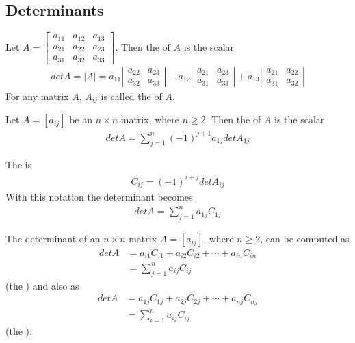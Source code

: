 \documentclass{article}
\begin{document}
\subsection{Determinants}
\begin{definition}
    Let $A=\begin{bmatrix}
        a_{11} &a_{12} &a_{13}\\ 
        a_{21} &a_{22} &a_{23}\\ 
        a_{31} &a_{32} &a_{33}
    \end{bmatrix}$.
    Then the  of $A$ is the scalar
    \begin{align*}
        det A = |A| = a_{11}\left|\begin{array}{ccc}
            a_{22} &a_{23}\\ 
            a_{32} &a_{33}
        \end{array}\right| -
        a_{12}\left|\begin{array}{ccc}
            a_{21} &a_{23}\\ 
            a_{31} &a_{33}
        \end{array}\right| +
        a_{13}\left|\begin{array}{ccc}
            a_{21} &a_{22}\\ 
            a_{31} &a_{32}
        \end{array}\right|
    \end{align*}
    For any matrix $A$, $A_{ij}$ is called the  of $A$.
\end{definition}
\begin{definition}
    Let $A=[a_{ij}]$ be an $n\times n$ matrix, where $n\geq 2$. Then the  of $A$ is the scalar
    \begin{align*}
        det A = \sum_{j=1}^n (-1)^{j+1}a_{1j}det A_{1j}
    \end{align*}
\end{definition}
\begin{definition}
    The  is
    \begin{align*}
        C_{ij}=(-1)^{i+j}det A_{ij}
    \end{align*}
    With this notation the determinant becomes
    \begin{align*}
        det A = \sum^n_{j=1} a_{1j}C_{1j}
    \end{align*}
\end{definition}
\begin{theorem}
    The determinant of an $n\times n$ matrix $A=[a_{ij}]$, where $n\geq 2$, can be computed as
    \begin{align*}
        det A &= a_{i1}C_{i1}+a_{i2}C_{i2} + \cdots + a_{in}C_{in}\\
        &= \sum_{j=1}^n a_{ij}C_{ij}
    \end{align*}
    (the ) and also as
    \begin{align*}
        det A &= a_{1j}C_{1j}+a_{2j}C_{2j} + \cdots + a_{nj}C_{nj}\\
        &= \sum_{i=1}^n a_{ij}C_{ij}
    \end{align*}
    (the ).
\end{theorem}
\end{document}
